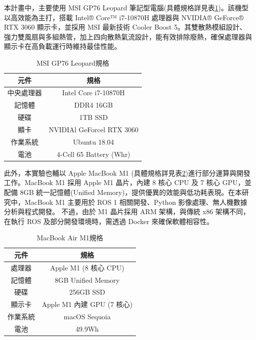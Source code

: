 \documentclass[12pt]{article}       %
\begin{document}
本計畫中，主要使用 MSI GP76 Leopard 筆記型電腦(具體規格詳見表\ref{tab:MSI GP76 Leopard})。該機型以高效能為主打，搭載 Intel® Core™ i7-10870H 處理器與 NVIDIA® GeForce® RTX 3060 顯示卡，並採用 MSI 最新技術 Cooler Boost 5。其雙散熱模組設計、強力雙風扇與多組熱管，加上四向散熱氣流設計，能有效排除廢熱，確保處理器與顯示卡在高負載運行時維持最佳性能。
\begin{table}[H]
    \caption{MSI GP76 Leopard規格}
    \vspace{12pt} %
    \renewcommand{\arraystretch}{1.5} %
    \centering
    \begin{tabular}{|c|c|}
        \hline
        \textbf{元件} & \textbf{規格}                 \\ \hline
        中央處理器       & Intel\textregistered{} Core\texttrademark{} i7-10870H \\ \hline
        記憶體         & DDR4 16GB                   \\ \hline
        硬碟          & 1TB SSD                     \\ \hline
        顯卡          & NVIDIAl\textregistered{} GeForcel\textregistered{} RTX 3060   \\ \hline
        作業系統        & Ubuntu 18.04                \\ \hline
        電池          & 4-Cell 65 Battery (Whr)     \\ \hline
    \end{tabular}
    \label{tab:MSI GP76 Leopard}
\end{table}
此外，本實驗也輔以 Apple MacBook M1 (具體規格詳見表\ref{tab:MacBook Air M1})進行部分運算與開發工作。MacBook M1 採用 Apple M1 晶片，內建 8 核心 CPU 及 7 核心 GPU，並配備 8GB 統一記憶體(Unified Memory)，提供優異的效能與低功耗表現。在本研究中，MacBook M1 主要用於 ROS 1 相關開發、Python 影像處理、無人機數據分析與程式開發。
不過，由於 M1 晶片採用 ARM 架構，與傳統 x86 架構不同，在執行 ROS 及部分開發環境時，需透過 Docker 來確保軟體相容性。
\begin{table}[H]
    \caption{MacBook Air M1規格}
    \vspace{12pt} %
    \renewcommand{\arraystretch}{1.5} %
    \centering
    \begin{tabular}{|c|c|}
        \hline
        \textbf{元件} & \textbf{規格}            \\ \hline
        處理器         & Apple M1 (8 核心 CPU)    \\ \hline
        記憶體         & 8GB Unified Memory     \\ \hline
        硬碟          & 256GB SSD              \\ \hline
        顯示卡         & Apple M1 內建 GPU (7 核心) \\ \hline
        作業系統        & macOS Sequoia          \\ \hline
        電池          & 49.9Wh                 \\ \hline
    \end{tabular}
    \label{tab:MacBook Air M1}
\end{table}
\end{document}
